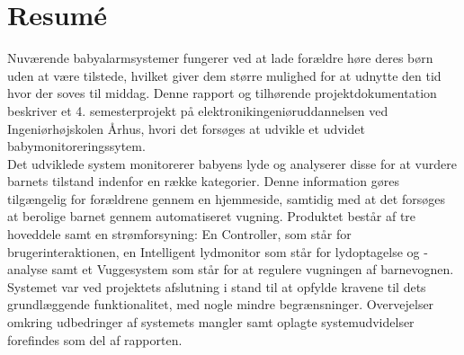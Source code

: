 \chapter{Resumé} \label{resume}

Nuværende babyalarmsystemer fungerer ved at lade forældre høre deres børn uden at være tilstede, hvilket giver dem større mulighed for at udnytte den tid hvor der soves til middag.
Denne rapport og tilhørende projektdokumentation beskriver et 4. semesterprojekt på elektronikingeniøruddannelsen ved Ingeniørhøjskolen Århus, hvori det forsøges at udvikle et udvidet babymonitoreringssytem.\\
Det udviklede system monitorerer babyens lyde og analyserer disse for at vurdere barnets tilstand indenfor en række kategorier. Denne information gøres tilgængelig for forældrene gennem en hjemmeside, samtidig med at det forsøges at berolige barnet gennem automatiseret vugning.
Produktet består af tre hoveddele samt en strømforsyning: En Controller, som står for brugerinteraktionen, en Intelligent lydmonitor som står for lydoptagelse og -analyse samt et Vuggesystem som står for at regulere vugningen af barnevognen. \\
Systemet var ved projektets afslutning i stand til at opfylde kravene til dets grundlæggende funktionalitet, med nogle mindre begrænsninger. Overvejelser omkring udbedringer af systemets mangler samt oplagte systemudvidelser forefindes som del af rapporten.\\